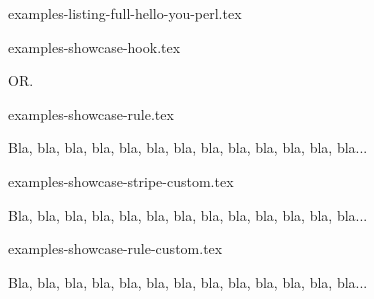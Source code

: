 \begin{filecontents*}[overwrite]{examples-listing-full-hello-you-perl.tex}
\end{filecontents*}


\begin{filecontents*}[overwrite]{examples-showcase-hook.tex}
\begin{tdocshowcase}
\end{tdocshowcase}

OR.

\begin{tdocshowcase}
\end{tdocshowcase}
\end{filecontents*}


\begin{filecontents*}[overwrite]{examples-showcase-rule.tex}
\begin{tdocshowcase}[style = rule]
    Bla, bla, bla, bla, bla, bla, bla, bla, bla, bla, bla, bla, bla...
\end{tdocshowcase}
\end{filecontents*}


\begin{filecontents*}[overwrite]{examples-showcase-stripe-custom.tex}
\begin{tdocshowcase}[style      = stripe,
                     col-stripe = green,
                     col-text   = purple,
                     before     = Mon début,
                     after      = Ma fin à moi]
    Bla, bla, bla, bla, bla, bla, bla, bla, bla, bla, bla, bla, bla...
\end{tdocshowcase}
\end{filecontents*}


\begin{filecontents*}[overwrite]{examples-showcase-rule-custom.tex}
\begin{tdocshowcase}[style      = rule,
                     col-stripe = red,
                     col-text   = orange!75!black,
                     before     = My beginning,
                     after      = My end]
    Bla, bla, bla, bla, bla, bla, bla, bla, bla, bla, bla, bla, bla...
\end{tdocshowcase}
\end{filecontents*}


